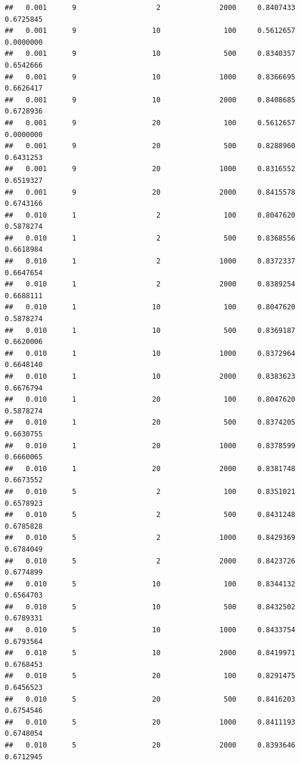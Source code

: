 \documentclass[]{article}
\begin{document}
\begin{lstlisting}
##   0.001      9                   2              2000     0.8407433  0.6725845
##   0.001      9                  10               100     0.5612657  0.0000000
##   0.001      9                  10               500     0.8340357  0.6542666
##   0.001      9                  10              1000     0.8366695  0.6626417
##   0.001      9                  10              2000     0.8408685  0.6728936
##   0.001      9                  20               100     0.5612657  0.0000000
##   0.001      9                  20               500     0.8288960  0.6431253
##   0.001      9                  20              1000     0.8316552  0.6519327
##   0.001      9                  20              2000     0.8415578  0.6743166
##   0.010      1                   2               100     0.8047620  0.5878274
##   0.010      1                   2               500     0.8368556  0.6618984
##   0.010      1                   2              1000     0.8372337  0.6647654
##   0.010      1                   2              2000     0.8389254  0.6688111
##   0.010      1                  10               100     0.8047620  0.5878274
##   0.010      1                  10               500     0.8369187  0.6620006
##   0.010      1                  10              1000     0.8372964  0.6648140
##   0.010      1                  10              2000     0.8383623  0.6676794
##   0.010      1                  20               100     0.8047620  0.5878274
##   0.010      1                  20               500     0.8374205  0.6630755
##   0.010      1                  20              1000     0.8378599  0.6660065
##   0.010      1                  20              2000     0.8381748  0.6673552
##   0.010      5                   2               100     0.8351021  0.6578923
##   0.010      5                   2               500     0.8431248  0.6785828
##   0.010      5                   2              1000     0.8429369  0.6784049
##   0.010      5                   2              2000     0.8423726  0.6774899
##   0.010      5                  10               100     0.8344132  0.6564703
##   0.010      5                  10               500     0.8432502  0.6789331
##   0.010      5                  10              1000     0.8433754  0.6793564
##   0.010      5                  10              2000     0.8419971  0.6768453
##   0.010      5                  20               100     0.8291475  0.6456523
##   0.010      5                  20               500     0.8416203  0.6754546
##   0.010      5                  20              1000     0.8411193  0.6748054
##   0.010      5                  20              2000     0.8393646  0.6712945

\end{lstlisting}
\end{document}
